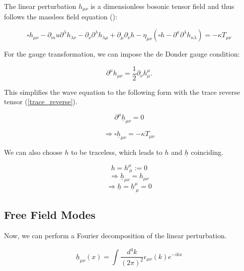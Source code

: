 The linear perturbation $h_{\mu\nu}$ is a dimensionless bosonic tensor field and thus follows the massless field equation (\cite{van_holten_gravitational_2019}):

\begin{equation}
    \square h_{\mu\nu} -\partial_mu \partial^\lambda h_{\lambda\nu}-\partial_\nu\partial^\lambda h_{\lambda\mu}+\partial_\mu \partial_\nu h - \eta_{\mu\nu}(\square h-\partial^\kappa \partial^\lambda h_{\kappa\lambda})=-\kappa T_{\mu\nu}
\end{equation}

For the gauge transformation, we can impose the de Donder gauge condition:

\begin{equation}
    \partial^\mu h_{\mu\nu} = \frac{1}{2}\partial_\nu h_\mu^\mu .
    \label{de_donder}
\end{equation}

This simplifies the wave equation to the following form with the trace reverse tensor (\ref{trace_reverse}).

\begin{equation}
    \partial^\mu \underline{h}_{\mu\nu}=0
\end{equation}

\begin{equation}
    \Rightarrow \square \underline{h}_{\mu\nu}=-\kappa T_{\mu\nu}
\end{equation}

We can also choose $h$ to be traceless, which leads to $h$ and $\underline{h}$ coinciding.

\begin{equation}
    h = h_{\ \mu}^\mu := 0
\end{equation}
\begin{equation}
    \Rightarrow \underline{h}_{\mu\nu}=h_{\mu\nu}
\end{equation}
\begin{equation}
    \Rightarrow \underline{h} = \underline{h}_{\ \mu}^\mu =0
\end{equation}

\subsection{Free Field Modes}

Now, we can perform a Fourier decomposition of the linear perturbation.

\begin{equation}
    \underline{h}_{\mu\nu}(x) = \int \frac{d^4k}{(2\pi)^2} \epsilon_{\mu\nu}(k)e^{-ikx}
\end{equation}

